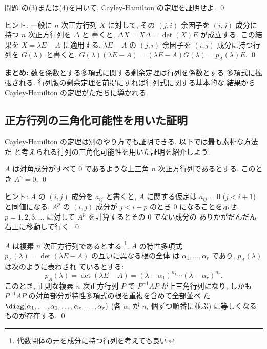 \documentclass[12pt,twoside]{jarticle}
\begin{document}

\begin{question}
  問題  の(3)または(4)を用いて, 
  Cayley-Hamilton の定理を証明せよ. \qed
\end{question}

\noindent
ヒント: 一般に $n$ 次正方行列 $X$ に対して,
その $(j,i)$ 余因子を $(i,j)$ 成分に持つ $n$ 次正方行列を $\Delta$ と
書くと, $\Delta X = X \Delta = \det(X)E$ が成立する.  
この結果を $X = \lambda E - A$ に適用する.  $\lambda E - A$ 
の $(j,i)$ 余因子を $(i,j)$ 成分に持つ行列を $G(\lambda)$ と書くと, 
$G(\lambda)(\lambda E - A) = (\lambda E - A)G(\lambda) = p_A(\lambda) E$.
\qed

\bigskip
\noindent
{\large {\bf まとめ:} 数を係数とする多項式に関する剰余定理は行列を係数とする
  多項式に拡張される.  行列版の剰余定理を前提にすれば行列式に関する基本的な
  結果から Cayley-Hamilton の定理がただちに導かれる.}


\subsection{正方行列の三角化可能性を用いた証明}
\label{sec:CH-triangulation}

Cayley-Hamilton の定理は別のやり方でも証明できる.  以下では最も素朴な方法だ
と考えられる行列の三角化可能性を用いた証明を紹介しよう.

\begin{question}
\label{q:nilpotent-matrix}
  $A$ は対角成分がすべて $0$ であるような上三角 $n$ 次正方行列であるとする.
  このとき $A^n=0$.
  \qed
\end{question}

\noindent
ヒント: $A$ の $(i,j)$ 成分を $a_{ij}$ と書くと, 
$A$ に関する仮定は $a_{ij}=0$ ($j<i+1$) と同値になる.
$A^p$ の $(i,j)$ 成分が $j<i+p$ のとき $0$ になることを示せ.
$p=1,2,3,\ldots$ に対して $A^p$ を計算するとその $0$ でない成分の
ありかがだんだん右上に移動して行く.
\qed


\begin{question}[複素正方行列の三角化可能性]
\label{q:triangularizable2}
  $A$ は複素 $n$ 次正方行列であるとする%
  \footnote{代数閉体の元を成分に持つ行列を考えても良い.}.  %
  $A$ の特性多項式 $p_A(\lambda)=\det(\lambda E - A)$ の互いに異なる根の全体
  は $\alpha_1,\ldots,\alpha_r$ であり, $p_A(\lambda)$ は次のように表わされ
  ているとする:
  \begin{equation*}
    p_A(\lambda)=\det(\lambda E - A)
    = (\lambda-\alpha_1)^{n_1}\cdots(\lambda-\alpha_r)^{n_r}.
  \end{equation*}
  このとき, 正則な複素 $n$ 次正方行列 $P$ で $P^{-1}AP$ が上三角行列になり, 
  しかも $P^{-1}AP$ の対角部分が特性多項式の根を重複を含めて全部並べ
  た $\diag(\alpha_1,\dots,\alpha_1,\dots,\alpha_r,\dots,\alpha_r)$ 
  (各 $\alpha_i$ が $n_i$ 個ずつ順番に並ぶ) に等しくなるものが存在する.
  \qed
\end{question}
\end{document}
